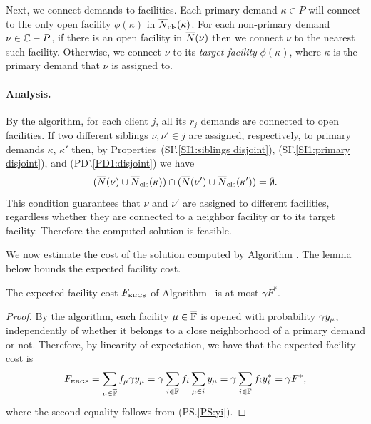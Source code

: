 Next, we connect demands to facilities.
Each primary demand $\kappa\in P$ will connect
to the only open facility $\phi(\kappa)$ in ${\overline{N}}_{\text{cls}}(\kappa)$.  
For each non-primary demand $\nu\in \overline{\mathbb{C}} - P$, if
there is an open facility in ${\overline{N}}(\nu)$ then we connect
$\nu$ to the nearest such facility. Otherwise, we connect
$\nu$ to its \emph{target facility} $\phi(\kappa)$, where $\kappa$ is the primary
demand that $\nu$ is assigned to. 


\paragraph{Analysis.}
By the algorithm, for each client $j$, all its $r_j$ demands are connected to
open facilities. If two different siblings $\nu,\nu'\in j$ are assigned, respectively,
to primary demands $\kappa$, $\kappa'$ then, by
Properties~(SI'.\ref{SI1:siblings disjoint}), (SI'.\ref{SI1:primary
  disjoint}), and (PD'.\ref{PD1:disjoint}) we have
%
\begin{equation*}
( {\overline{N}}(\nu) \cup {\overline{N}}_{\text{cls}}(\kappa)) \cap ({\overline{N}}(\nu')\cup {\overline{N}}_{\text{cls}}(\kappa')) = \emptyset.
\end{equation*}
%
This condition guarantees that $\nu$ and $\nu'$ are assigned to different facilities,
regardless whether they are connected to a neighbor facility or to its target facility.
Therefore the computed solution is feasible.

\smallskip

We now estimate the cost of the solution computed by Algorithm {\EBGS}. The lemma
below bounds the expected facility cost.

\begin{lemma} \label{lem: EBGS facility cost}
The expected facility cost $F_{\mbox{\tiny\rm EBGS}}$ of Algorithm~{\EBGS} is at most $\gamma F^\ast$.
\end{lemma}

\begin{proof}
By the algorithm, each facility $\mu\in \overline{\mathbb{F}}$ is opened with
probability $\gamma {\bar y}_{\mu}$, independently of whether it belongs to a
close neighborhood of a primary demand or not. Therefore, by
  linearity of expectation, we have that the expected facility cost is
%
\begin{equation*}
	F_{\mbox{\tiny\rm EBGS}} = \sum_{\mu \in \overline{\mathbb{F}}} f_\mu \gamma {\bar y}_{\mu} 
			= \gamma \sum_{i\in \mathbb{F}} f_i \sum_{\mu\in i} {\bar y}_{\mu} 
			= \gamma \sum_{i \in \mathbb{F}} f_i y_i^\ast = \gamma F^\ast,
\end{equation*}
%
where the second equality follows from (PS.\ref{PS:yi}).
\end{proof}

